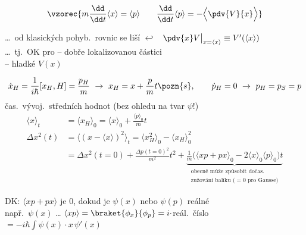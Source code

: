 \begin{veta}
\[
  \vzorec{m\frac{\dd}{\dd t}\langle x\rangle = \langle p\rangle \qquad
  \frac{\dd}{\dd t}\langle p\rangle = -\Big\langle\pdv{V}{x}\Big\rangle}
\]
\end{veta}
\dots\ od klasických pohyb.\ rovnic se liší \quad $\hookleftarrow$ \ $\pdv{x}V\big|_{x=\langle x\rangle} \equiv V'(\langle x\rangle)$ \\
\dots\ tj.\ OK pro \quad -- dobře lokalizovanou částici \\
\hspace*{3.05cm} -- hladké $V(x)$ \quad {}

\begin{priklad}
\[
  \dot x_H = \frac{1}{i\hbar}[x_H,H] = \frac{p_H}{m} \ \to\ x_H = x + \frac{p}{m}t \pozn{s}, \qquad
  \dot p_H = 0 \ \to\ p_H = p_S = p
\]
čas.\ vývoj.\ středních hodnot \hfill (bez ohledu na tvar $\psi$!)
\begin{align*}
  \langle x\rangle_t &= \langle x_H\rangle_0 = \langle x\rangle_0 + \frac{\langle p\rangle_0}{m}t \\
  \Delta x^2(t) &= \langle(x - \langle x\rangle)^2\rangle_t = \langle x_H^2\rangle_0 - \langle x_H\rangle_0^2 \\
  &= \Delta x^2(t=0) + \frac{\Delta p(t=0)^2}{m^2}t^2 + \underbrace{\frac1m\big(\langle xp+px\rangle_0 - 2\langle x\rangle_0\langle p\rangle_0\big)t}_{\substack{\text{obecně může způsobit dočas.}\\ \text{zužování balíku ($=0$ pro Gausse)}}}
\end{align*}
\begin{center}
\end{center}
DK: $\langle xp + px\rangle$ je $0$, dokud je $\psi(x)$ nebo $\psi(p)$ reálné \\
\quad např.\ $\psi(x)$ \dots \quad
$\langle xp\rangle = \braket{\phi_x}{\phi_p} = i\cdot$reál.\ číslo $= -i\hbar\int\psi(x)\cdot x\,\psi'(x)$ \\

\end{priklad}
